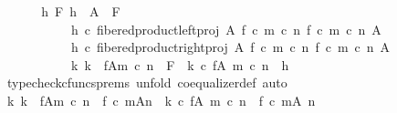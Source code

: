 \begin{isabellebody}
\ \ \isamarkupfalse%
\ \isamarkupfalse%
\ {\isachardoublequoteopen}{\isasymAnd}\ h\ F{\isachardot}{\kern0pt}\ h\ {\isacharcolon}{\kern0pt}\ A\ {\isasymrightarrow}\ F\ {\isasymLongrightarrow}\isanewline
\ \ \ \ \ \ \ \ \ \ \ h\ {\isasymcirc}\isactrlsub c\ fibered{\isacharunderscore}{\kern0pt}product{\isacharunderscore}{\kern0pt}left{\isacharunderscore}{\kern0pt}proj\ A\ {\isacharparenleft}{\kern0pt}f\ {\isasymcirc}\isactrlsub c\ m\ {\isasymcirc}\isactrlsub c\ n{\isacharparenright}{\kern0pt}\ {\isacharparenleft}{\kern0pt}f\ {\isasymcirc}\isactrlsub c\ m\ {\isasymcirc}\isactrlsub c\ n{\isacharparenright}{\kern0pt}\ A\ {\isacharequal}{\kern0pt}\isanewline
\ \ \ \ \ \ \ \ \ \ \ h\ {\isasymcirc}\isactrlsub c\ fibered{\isacharunderscore}{\kern0pt}product{\isacharunderscore}{\kern0pt}right{\isacharunderscore}{\kern0pt}proj\ A\ {\isacharparenleft}{\kern0pt}f\ {\isasymcirc}\isactrlsub c\ m\ {\isasymcirc}\isactrlsub c\ n{\isacharparenright}{\kern0pt}\ {\isacharparenleft}{\kern0pt}f\ {\isasymcirc}\isactrlsub c\ m\ {\isasymcirc}\isactrlsub c\ n{\isacharparenright}{\kern0pt}\ A\ {\isasymLongrightarrow}\isanewline
\ \ \ \ \ \ \ \ \ \ \ {\isacharparenleft}{\kern0pt}{\isasymexists}{\isacharbang}{\kern0pt}k{\isachardot}{\kern0pt}\ k\ {\isacharcolon}{\kern0pt}\ f{\isasymlparr}A{\isasymrparr}\isactrlbsub m\ {\isasymcirc}\isactrlsub c\ n\isactrlesub \ {\isasymrightarrow}\ F\ {\isasymand}\ k\ {\isasymcirc}\isactrlsub c\ f{\isasymrestriction}\isactrlbsub {\isacharparenleft}{\kern0pt}A{\isacharcomma}{\kern0pt}\ m\ {\isasymcirc}\isactrlsub c\ n{\isacharparenright}{\kern0pt}\isactrlesub \ {\isacharequal}{\kern0pt}\ h{\isacharparenright}{\kern0pt}{\isachardoublequoteclose}\isanewline
\ \ \ \ \isamarkupfalse%
\ {\isacharparenleft}{\kern0pt}typecheck{\isacharunderscore}{\kern0pt}cfuncs{\isacharunderscore}{\kern0pt}prems{\isacharcomma}{\kern0pt}\ unfold\ coequalizer{\isacharunderscore}{\kern0pt}def{}{\isacharcomma}{\kern0pt}\ auto{\isacharparenright}{\kern0pt}\isanewline
\ \ \isamarkupfalse%
\ \isamarkupfalse%
\ {\isachardoublequoteopen}{\isasymexists}{\isacharbang}{\kern0pt}k{\isachardot}{\kern0pt}\ k\ {\isacharcolon}{\kern0pt}\ f{\isasymlparr}A{\isasymrparr}\isactrlbsub m\ {\isasymcirc}\isactrlsub c\ n\isactrlesub \ {\isasymrightarrow}\ {\isacharparenleft}{\kern0pt}f\ {\isasymcirc}\isactrlsub c\ m{\isacharparenright}{\kern0pt}{\isasymlparr}A{\isasymrparr}\isactrlbsub n\isactrlesub \ {\isasymand}\ k\ {\isasymcirc}\isactrlsub c\ f{\isasymrestriction}\isactrlbsub {\isacharparenleft}{\kern0pt}A{\isacharcomma}{\kern0pt}\ m\ {\isasymcirc}\isactrlsub c\ n{\isacharparenright}{\kern0pt}\isactrlesub \ {\isacharequal}{\kern0pt}\ {\isacharparenleft}{\kern0pt}f\ {\isasymcirc}\isactrlsub c\ m{\isacharparenright}{\kern0pt}{\isasymrestriction}\isactrlbsub {\isacharparenleft}{\kern0pt}A{\isacharcomma}{\kern0pt}\ n{\isacharparenright}{\kern0pt}\isactrlesub {\isachardoublequoteclose}\isanewline

\end{isabellebody}
